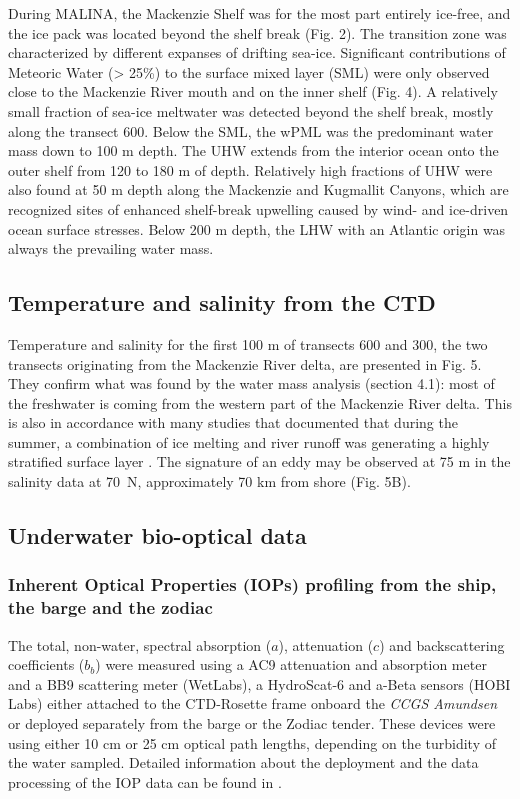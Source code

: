 \documentclass[essd, manuscript]{copernicus}
\begin{document}
During MALINA, the Mackenzie Shelf was for the most part entirely ice-free, and the ice pack was located beyond the shelf break (Fig. 2). The transition zone was characterized by different expanses of drifting sea-ice. Significant contributions of Meteoric Water (> 25\%) to the surface mixed layer (SML) were only observed close to the Mackenzie River mouth and on the inner shelf (Fig. 4). A relatively small fraction of sea-ice meltwater was detected beyond the shelf break, mostly along the transect 600. Below the SML, the wPML was the predominant water mass down to 100  m depth. The UHW extends from the interior ocean onto the outer shelf from 120 to 180 m of depth. Relatively high fractions of UHW were also found at 50 m depth along the Mackenzie and Kugmallit Canyons, which are recognized sites of enhanced shelf-break upwelling caused by wind- and ice-driven ocean surface stresses. Below 200 m depth, the LHW with an Atlantic origin was always the prevailing water mass.

\subsection{Temperature and salinity from the CTD}

Temperature and salinity for the first 100 m of transects 600 and 300, the two transects originating from the Mackenzie River delta, are presented in Fig. 5. They confirm what was found by the water mass analysis (section 4.1): most of the freshwater is coming from the western part of the Mackenzie River delta. This is also in accordance with many studies that documented that during the summer, a combination of ice melting and river runoff was generating a highly stratified surface layer \citep{Carmack2002, Forest2013}. The signature of an eddy may be observed at 75 m in the salinity data at 70~\textdegree N, approximately 70 km from shore (Fig. 5B).

\subsection{Underwater bio-optical data}

\subsubsection{Inherent Optical Properties (IOPs) profiling from the ship, the barge and the zodiac}

The total, non-water, spectral absorption ($a$), attenuation ($c$) and backscattering coefficients ($b_b$) were measured using a AC9 attenuation and absorption meter and a BB9 scattering meter (WetLabs), a HydroScat-6 and a-Beta sensors (HOBI Labs) either attached to the CTD-Rosette frame onboard the \textit{CCGS Amundsen} or deployed separately from the barge or the Zodiac tender. These devices were using either 10 cm or 25 cm optical path lengths, depending on the turbidity of the water sampled. Detailed information about the deployment and the data processing of the IOP data can be found in \citet{Doxaran2012}.
\end{document}
